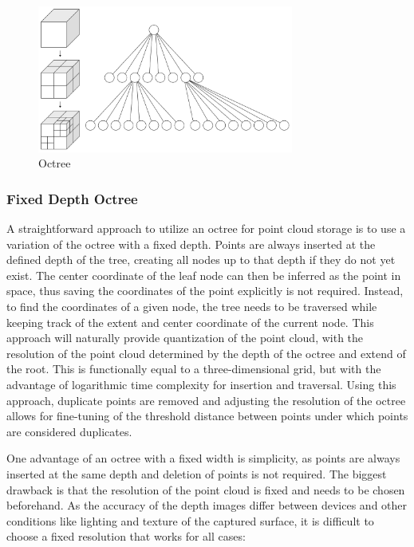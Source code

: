 \begin{figure}[h]
    \centering
    \includegraphics[width=0.75\textwidth]{images/octree}
    \caption{Octree}
    \label{fig:octrree}
\end{figure}

\subsubsection{Fixed Depth Octree}
A straightforward approach to utilize an octree for point cloud storage is to use a variation of the octree with a fixed depth.
Points are always inserted at the defined depth of the tree, creating all nodes up to that depth if they do not yet exist.
The center coordinate of the leaf node can then be inferred as the point in space,
thus saving the coordinates of the point explicitly is not required.
Instead, to find the coordinates of a given node, the tree needs to be traversed while keeping track of
the extent and center coordinate of the current node.
This approach will naturally provide quantization of the point cloud, with the resolution of the point cloud
determined by the depth of the octree and extend of the root.
This is functionally equal to a three-dimensional grid,
but with the advantage of logarithmic time complexity for insertion and traversal.
Using this approach, duplicate points are removed and adjusting the resolution of the octree
allows for fine-tuning of the threshold distance between points under which points are considered duplicates.

One advantage of an octree with a fixed width is simplicity, as points are always inserted at the same depth and deletion of points is not required.
The biggest drawback is that the resolution of the point cloud is fixed and needs to be chosen beforehand.
As the accuracy of the depth images differ between devices and other conditions like lighting and texture of the captured surface,
it is difficult to choose a fixed resolution that works for all cases:

